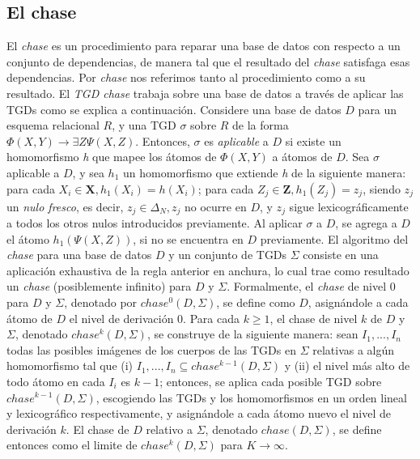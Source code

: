 \documentclass[11pt,a4paper,twoside]{tesis}
\begin{document}
\subsection{El chase}

El \textit{chase} es un procedimiento para reparar una base de datos con respecto a un conjunto de dependencias, de manera tal que el resultado del \textit{chase} satisfaga esas dependencias. Por \textit{chase} nos referimos tanto al procedimiento como a su resultado. El \textit{TGD chase} trabaja sobre una base de datos a través de aplicar las TGDs como se explica a continuación. Considere una base de datos $D$ para un esquema relacional $R$, y una TGD $\sigma$ sobre $R$ de la forma $\Phi (X, Y) \rightarrow \exists Z \Psi (X, Z)$. Entonces, $\sigma$ es \textit{aplicable} a $D$ si existe un homomorfismo \textit{h} que mapee los átomos de $\Phi (X, Y)$ a átomos de $D$. Sea $\sigma$ aplicable a $D$, y sea $h_1$ un homomorfismo que extiende \textit{h} de la siguiente manera: para cada $X_i \in \textbf{X}, h_1(X_i) = h(X_i)$; para cada $Z_j \in \textbf{Z}, h_1(Z_j) = z_j$, siendo $z_j$ un \textit{nulo fresco}, es decir, $z_j \in \Delta_N, z_j$ no ocurre en $D$, y $z_j$ sigue lexicográficamente a todos los otros nulos introducidos previamente. Al aplicar $\sigma$ a $D$, se agrega a $D$ el átomo $h_1(\Psi (X, Z))$, si no se encuentra en $D$ previamente.
El algoritmo del \textit{chase} para una base de datos $D$ y un conjunto de TGDs $\Sigma$ consiste en una aplicación exhaustiva de la regla anterior en anchura, lo cual trae como resultado un \textit{chase} (posiblemente infinito) para $D$ y $\Sigma$. Formalmente, el \textit{chase} de nivel 0 para $D$ y $\Sigma$, denotado por $chase^0(D,\Sigma)$, se define como $D$, asignándole a cada átomo de $D$ el nivel de derivación 0. Para cada $k \geq 1$, el chase de nivel $k$ de $D$ y $\Sigma$, denotado $chase^k(D, \Sigma)$, se construye de la siguiente manera: sean $I_1,...,I_n$ todas las posibles imágenes de los cuerpos de las TGDs en $\Sigma$ relativas a algún homomorfismo tal que (i) $I_1,...,I_n \subseteq chase^{k-1}(D,\Sigma)$ y (ii) el nivel más alto de todo átomo en cada $I_i$ es $k - 1$; entonces, se aplica cada posible TGD sobre $chase^{k-1}(D,\Sigma)$, escogiendo las TGDs y los homomorfismos en un orden lineal y lexicográfico respectivamente, y asignándole a cada átomo nuevo el nivel de derivación $k$. El chase de $D$ relativo a $\Sigma$, denotado $chase(D,\Sigma)$, se define entonces como el limite de $chase^k(D,\Sigma)$ para $K \rightarrow \infty$. 
\end{document}
